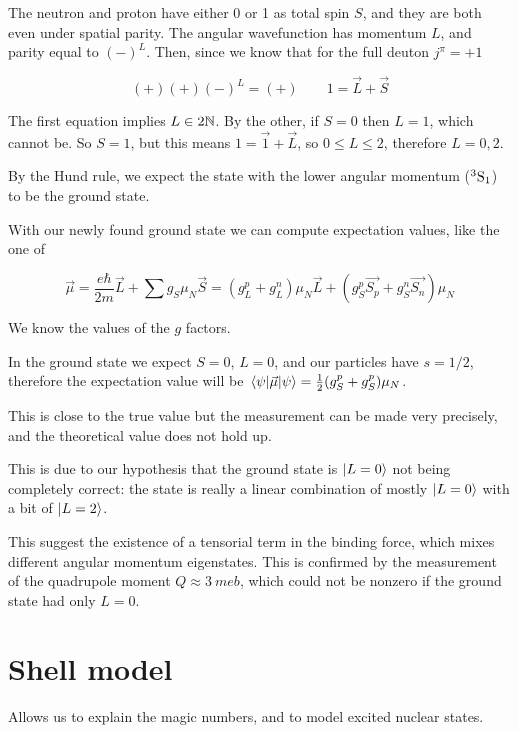 \documentclass[main.tex]{subfiles}
\begin{document}
The neutron and proton have either 0 or 1 as total spin \(S\), and they are both even under spatial parity.
The angular wavefunction has momentum \(L\), and parity equal to \((-)^L\). Then, since we know that for the full deuton \(j^\pi = +1\)

\begin{equation}
    (+)(+)(-)^L = (+) \qquad 1 = \vec{L} + \vec{S}
\end{equation}

The first equation implies \(L \in 2 \mathbb{N}\). By the other, if \(S=0\) then \(L=1\), which cannot be. So \(S=1\), but this means \(1 = \vec{1} + \vec{L}\), so \(0 \leq L \leq 2\), therefore \(L = 0, 2\).

By the Hund rule, we expect the state with the lower angular momentum (\(^{3} \ce{S}_1 \)) to be the ground state.

With our newly found ground state we can compute expectation values, like the one of

\begin{equation}
    \vec{\mu}  = \frac{e \hbar}{2m} \vec{L} + \sum g_S \mu_N \vec{S}
    = (g_L^p + g_L^n) \mu_N \vec{L} + (g_S^p \vec{S_p} + g_S^n \vec{S_n})  \mu_N
\end{equation}

We know the values of the \(g\) factors.

In the ground state we expect \(S = 0\), \(L=0\), and our particles have \(s = 1/2\), therefore the expectation value will be \(\ev{\vec{\mu}}{\psi} = \frac{1}{2} (g_S^p + g_S^p) \mu_N\).

This is close to the true value but the measurement can be made very precisely, and the theoretical value does not hold up.

This is due to our hypothesis that the ground state is \(\ket{L=0} \) not being completely correct: the state is really a linear combination of mostly \(\ket{L=0} \) with a bit of \(\ket{L=2} \).

This suggest the existence of a tensorial term in the binding force, which mixes different angular momentum eigenstates. This is confirmed by the measurement of the quadrupole moment \(Q \approx \SI{3}{meb} \),  which could not be nonzero if the ground state had only \(L=0\).

\section{Shell model}

Allows us to explain the magic numbers, and to model excited nuclear states.
\end{document}
